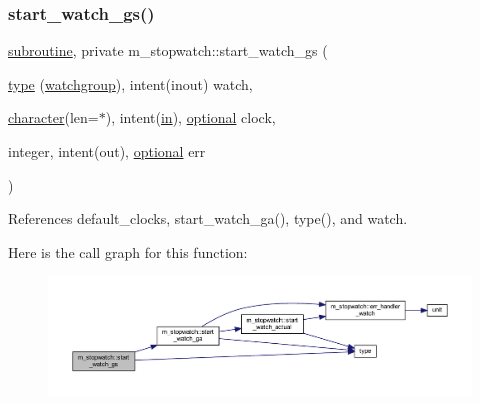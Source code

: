 \subsubsection{\texorpdfstring{start\+\_\+watch\+\_\+gs()}{start\_watch\_gs()}}
{\footnotesize\ttfamily \hyperlink{M__stopwatch_83_8txt_acfbcff50169d691ff02d4a123ed70482}{subroutine}, private m\+\_\+stopwatch\+::start\+\_\+watch\+\_\+gs (\begin{DoxyParamCaption}\item[{\hyperlink{stop__watch_83_8txt_a70f0ead91c32e25323c03265aa302c1c}{type} (\hyperlink{structm__stopwatch_1_1watchgroup}{watchgroup}), intent(inout)}]{watch,  }\item[{\hyperlink{option__stopwatch_83_8txt_abd4b21fbbd175834027b5224bfe97e66}{character}(len=$\ast$), intent(\hyperlink{M__journal_83_8txt_afce72651d1eed785a2132bee863b2f38}{in}), \hyperlink{option__stopwatch_83_8txt_aa4ece75e7acf58a4843f70fe18c3ade5}{optional}}]{clock,  }\item[{integer, intent(out), \hyperlink{option__stopwatch_83_8txt_aa4ece75e7acf58a4843f70fe18c3ade5}{optional}}]{err }\end{DoxyParamCaption})\hspace{0.3cm}{\ttfamily [private]}}



References default\+\_\+clocks, start\+\_\+watch\+\_\+ga(), type(), and watch.

Here is the call graph for this function\+:
\nopagebreak
\begin{figure}[H]
\begin{center}
\leavevmode
\includegraphics[width=350pt]{namespacem__stopwatch_a7c2f2f99682a7309aa136e7129bd3591_cgraph}
\end{center}
\end{figure}
\mbox{\label{namespacem__stopwatch_a4bd2594f2e02c3b97ff6f0556477b720}} 
